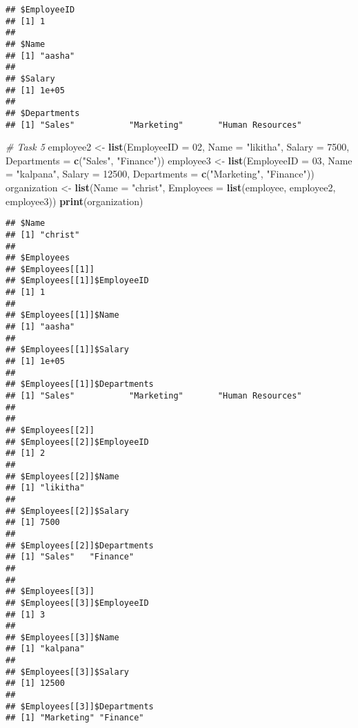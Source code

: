 \documentclass[
]{article}
\newenvironment{Shaded}{\begin{snugshade}}{\end{snugshade}}
\newcommand{\AttributeTok}[1]{\textcolor[rgb]{0.13,0.29,0.53}{#1}}
\newcommand{\CommentTok}[1]{\textcolor[rgb]{0.56,0.35,0.01}{\textit{#1}}}
\newcommand{\DecValTok}[1]{\textcolor[rgb]{0.00,0.00,0.81}{#1}}
\newcommand{\FunctionTok}[1]{\textcolor[rgb]{0.13,0.29,0.53}{\textbf{#1}}}
\newcommand{\NormalTok}[1]{#1}
\newcommand{\OtherTok}[1]{\textcolor[rgb]{0.56,0.35,0.01}{#1}}
\newcommand{\SpecialCharTok}[1]{\textcolor[rgb]{0.81,0.36,0.00}{\textbf{#1}}}
\newcommand{\StringTok}[1]{\textcolor[rgb]{0.31,0.60,0.02}{#1}}
\begin{document}
\begin{Shaded}
\end{Shaded}

\begin{verbatim}
## $EmployeeID
## [1] 1
## 
## $Name
## [1] "aasha"
## 
## $Salary
## [1] 1e+05
## 
## $Departments
## [1] "Sales"           "Marketing"       "Human Resources"
\end{verbatim}

\begin{Shaded}
\begin{Highlighting}[]
\CommentTok{\# Task 5}
\NormalTok{employee2 }\OtherTok{\textless{}{-}} \FunctionTok{list}\NormalTok{(}\AttributeTok{EmployeeID =} \DecValTok{02}\NormalTok{, }\AttributeTok{Name =} \StringTok{"likitha"}\NormalTok{, }\AttributeTok{Salary =} \DecValTok{7500}\NormalTok{, }\AttributeTok{Departments =} \FunctionTok{c}\NormalTok{(}\StringTok{"Sales"}\NormalTok{, }\StringTok{"Finance"}\NormalTok{))}
\NormalTok{employee3 }\OtherTok{\textless{}{-}} \FunctionTok{list}\NormalTok{(}\AttributeTok{EmployeeID =} \DecValTok{03}\NormalTok{, }\AttributeTok{Name =} \StringTok{"kalpana"}\NormalTok{, }\AttributeTok{Salary =} \DecValTok{12500}\NormalTok{, }\AttributeTok{Departments =} \FunctionTok{c}\NormalTok{(}\StringTok{"Marketing"}\NormalTok{, }\StringTok{"Finance"}\NormalTok{))}
\NormalTok{organization }\OtherTok{\textless{}{-}} \FunctionTok{list}\NormalTok{(}\AttributeTok{Name =} \StringTok{"christ"}\NormalTok{, }\AttributeTok{Employees =} \FunctionTok{list}\NormalTok{(employee, employee2, employee3))}
\FunctionTok{print}\NormalTok{(organization)}
\end{Highlighting}
\end{Shaded}

\begin{verbatim}
## $Name
## [1] "christ"
## 
## $Employees
## $Employees[[1]]
## $Employees[[1]]$EmployeeID
## [1] 1
## 
## $Employees[[1]]$Name
## [1] "aasha"
## 
## $Employees[[1]]$Salary
## [1] 1e+05
## 
## $Employees[[1]]$Departments
## [1] "Sales"           "Marketing"       "Human Resources"
## 
## 
## $Employees[[2]]
## $Employees[[2]]$EmployeeID
## [1] 2
## 
## $Employees[[2]]$Name
## [1] "likitha"
## 
## $Employees[[2]]$Salary
## [1] 7500
## 
## $Employees[[2]]$Departments
## [1] "Sales"   "Finance"
## 
## 
## $Employees[[3]]
## $Employees[[3]]$EmployeeID
## [1] 3
## 
## $Employees[[3]]$Name
## [1] "kalpana"
## 
## $Employees[[3]]$Salary
## [1] 12500
## 
## $Employees[[3]]$Departments
## [1] "Marketing" "Finance"
\end{verbatim}
\end{document}
